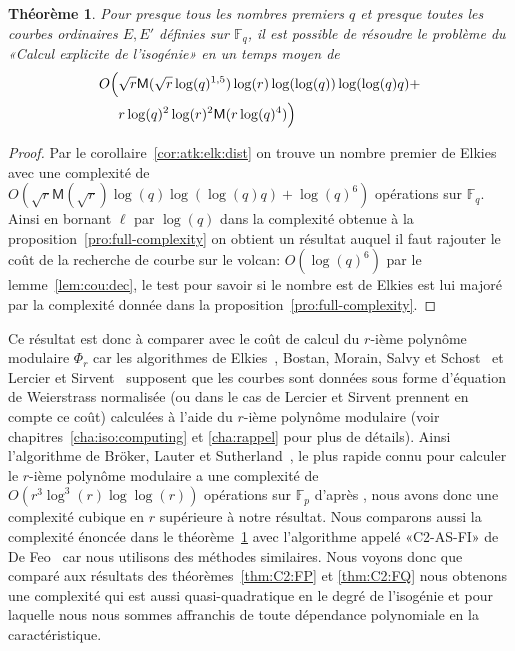 \documentclass[10pt,a4paper]{book}
\theoremstyle{plain}
\newtheorem{thm}{Théorème}[chapter]
\theoremstyle{definition}
\theoremstyle{definition}
\theoremstyle{definition}
\theoremstyle{definition}
\theoremstyle{definition}
\theoremstyle{remark}
\theoremstyle{remark}
\theoremstyle{definition}
\begin{document}
\begin{thm}
\label{thm:gen:elk:fin}
Pour presque tous les nombres premiers $q$ et presque toutes les courbes 
ordinaires $E,E'$ définies sur $\mathbb{F}_q$, il est possible de résoudre le 
problème du «Calcul explicite de l'isogénie» en un temps moyen de 
 \begin{equation*}
 \begin{alignedat}{1}
 O\Bigl( &\sqrt{r}\mathsf{M}(\sqrt{r}\log(q)^{1,5})\log(r)\log(\log(q))\log(\log(q) q) + \\
& r \log(q)^2\log(r)^2 \mathsf{M}(r \log(q)^4) \Bigr)
\end{alignedat}
 \end{equation*}
\end{thm}

\begin{proof}
Par le corollaire~\ref{cor:atk:elk:dist} on trouve un nombre premier de Elkies 
avec une complexité de $O(\sqrt{r}\mathsf{M}(\sqrt{r})\log(q)\log(\log(q) q)+\log(q)^6)$ 
opérations sur $\mathbb{F}_q$.
Ainsi en bornant $\ell$ par $\log(q)$ dans la complexité obtenue à la 
proposition~\ref{pro:full-complexity} on obtient un résultat auquel il faut 
rajouter le coût de la recherche de courbe sur le volcan: $O(\log(q)^6)$ par le 
lemme~\ref{lem:cou:dec}, le test pour savoir si le nombre est de Elkies 
est lui majoré par la complexité donnée dans la 
proposition~\ref{pro:full-complexity}.
\end{proof}

Ce résultat est donc à comparer avec le coût de calcul du $r$-ième polynôme 
modulaire $\Phi_r$ car les algorithmes de Elkies~\cite{Elkies1998}, Bostan, Morain, 
Salvy et Schost~\cite{BMSS08} et Lercier et Sirvent~\cite{Lercier-Sirvent2008}
supposent que les courbes sont données sous forme d'équation de Weierstrass
normalisée (ou dans le cas de Lercier et Sirvent prennent en compte ce coût) 
calculées à l'aide du $r$-ième polynôme modulaire (voir 
chapitres~\ref{cha:iso:computing} et \ref{cha:rappel} pour plus de détails).
Ainsi l'algorithme de Bröker, Lauter et Sutherland~\cite{BLS12}, le plus rapide
connu pour calculer le $r$-ième polynôme modulaire a une complexité de 
$O(r^3 \log^3(r) \log \log(r))$ opérations sur $\mathbb{F}_p$ d'après 
\cite[Theorem 1]{BLS12},  %
nous avons donc une complexité cubique en $r$ supérieure à notre résultat.
Nous comparons aussi la complexité énoncée dans le 
théorème~\ref{thm:gen:elk:fin} avec l'algorithme appelé «C2-AS-FI» de 
De Feo~\cite{DeFeo11} car nous utilisons des méthodes similaires. Nous voyons donc que 
comparé aux résultats des théorèmes~\ref{thm:C2:FP} et \ref{thm:C2:FQ} nous 
obtenons une complexité qui est aussi quasi-quadratique en le degré de 
l'isogénie et pour laquelle nous nous sommes affranchis de toute dépendance polynomiale
en la caractéristique.
\end{document}
